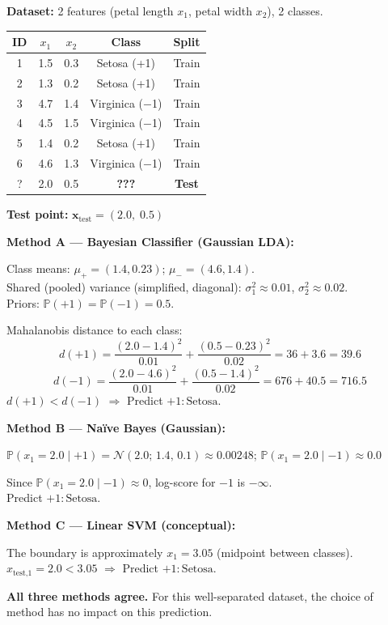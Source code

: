 \documentclass[12pt,a4paper]{article}
\newcommand{\Prob}{\mathbb{P}}
\newcommand{\x}{\mathbf{x}}
\begin{document}
\begin{tcolorbox}[exbox, title={Example 4: Iris-Style Classification (Simplified)}]
\textbf{Dataset:} 2 features (petal length $x_1$, petal width $x_2$), 2 classes.

\begin{center}
\begin{tabular}{ccccc}
\toprule
ID & $x_1$ & $x_2$ & Class & Split \\
\midrule
1 & 1.5 & 0.3 & Setosa (+1)    & Train \\
2 & 1.3 & 0.2 & Setosa (+1)    & Train \\
3 & 4.7 & 1.4 & Virginica ($-$1) & Train \\
4 & 4.5 & 1.5 & Virginica ($-$1) & Train \\
5 & 1.4 & 0.2 & Setosa (+1)    & Train \\
6 & 4.6 & 1.3 & Virginica ($-$1) & Train \\
\midrule
? & 2.0 & 0.5 & \textbf{???}   & \textbf{Test} \\
\bottomrule
\end{tabular}
\end{center}

\textbf{Test point:} $\x_\text{test} = (2.0,\; 0.5)$

\bigskip
\noindent\textbf{Method A — Bayesian Classifier (Gaussian LDA):}

Class means: $\mu_+ = (1.4, 0.23)$; $\mu_- = (4.6, 1.4)$.\\
Shared (pooled) variance (simplified, diagonal): $\sigma_1^2 \approx 0.01$, $\sigma_2^2 \approx 0.02$.\\
Priors: $\Prob(+1) = \Prob(-1) = 0.5$.

Mahalanobis distance to each class:
\[
  d(+1) = \frac{(2.0-1.4)^2}{0.01} + \frac{(0.5-0.23)^2}{0.02} = 36 + 3.6 = 39.6
\]
\[
  d(-1) = \frac{(2.0-4.6)^2}{0.01} + \frac{(0.5-1.4)^2}{0.02} = 676 + 40.5 = 716.5
\]
$d(+1) < d(-1)$ $\Rightarrow$ Predict $\boxed{+1: \text{Setosa}}$.

\bigskip
\noindent\textbf{Method B — Na\"{i}ve Bayes (Gaussian):}

$\Prob(x_1=2.0 \mid +1) = \mathcal{N}(2.0;\,1.4,\,0.1) \approx 0.00248$;
$\Prob(x_1=2.0 \mid -1) \approx 0.0$

Since $\Prob(x_1=2.0 \mid -1) \approx 0$, log-score for $-1$ is $-\infty$.\\
Predict $\boxed{+1: \text{Setosa}}$.

\bigskip
\noindent\textbf{Method C — Linear SVM (conceptual):}

The boundary is approximately $x_1 = 3.05$ (midpoint between classes).\\
$x_\text{test,1} = 2.0 < 3.05$ $\Rightarrow$ Predict $\boxed{+1: \text{Setosa}}$.

\bigskip
\textbf{All three methods agree.} For this well-separated dataset, the choice of method has no impact on this prediction.
\end{tcolorbox}
\end{document}
